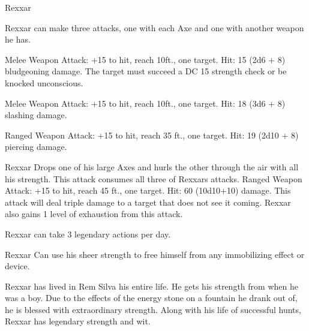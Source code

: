 \begin{monsterbox}{Rexxar}
	
	\begin{monsteraction}[Multiattack]
		Rexxar can make three attacks, one with each Axe and one with another weapon he has.
	\end{monsteraction}
	\begin{monsteraction}
		Melee Weapon Attack: +15 to hit, reach 10ft., one target. Hit: 15 (2d6 + 8) bludgeoning damage. The target must succeed a DC 15 strength check or be knocked unconscious.
	\end{monsteraction}
	\begin{monsteraction}
		Melee Weapon Attack: +15 to hit, reach 10ft., one target. Hit: 18 (3d6 + 8) slashing damage.
	\end{monsteraction}
	\begin{monsteraction}
		Ranged Weapon Attack: +15 to hit, reach 35 ft., one target. Hit: 19 (2d10 + 8) piercing damage.
	\end{monsteraction}
	\begin{monsteraction}
		Rexxar Drops one of his large Axes and hurls the other through the air with all his strength. This attack consumes all three of Rexxars attacks. Ranged Weapon Attack: +15 to hit, reach 45 ft., one target. Hit: 60 (10d10+10) damage. This attack will deal triple damage to a target that does not see it coming. Rexxar also gains 1 level of exhaustion from this attack.
	\end{monsteraction}
	Rexxar can take 3 legendary actions per day.
	\begin{monsteraction}
		Rexxar Can use his sheer strength to free himself from any immobilizing effect or device.
	\end{monsteraction}
	Rexxar has lived in Rem Silva his entire life. He gets his strength from when he was a boy. Due to the effects of the energy stone on a fountain he drank out of, he is blessed with extraordinary strength. Along with his life of successful hunts, Rexxar has legendary strength and wit.
\end{monsterbox}

